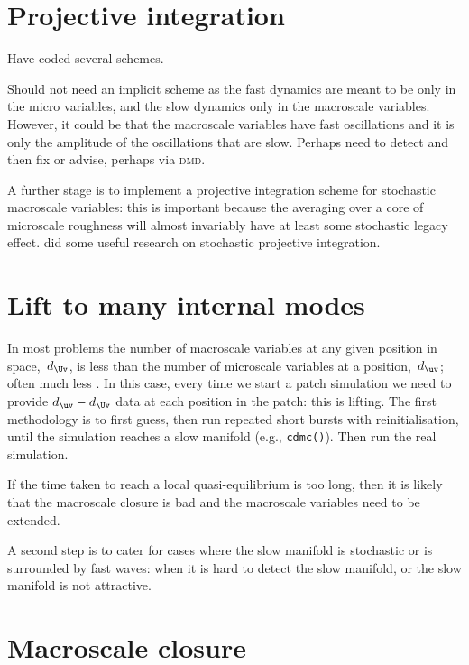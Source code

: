 \section{Projective integration}

Have coded several schemes.

Should not need an implicit scheme as the fast dynamics are meant to be only in the micro variables, and the slow dynamics only in the macroscale variables.
However, it could be that the macroscale variables have fast oscillations and it is only the amplitude of the oscillations that are slow.  
Perhaps need to detect and then fix or advise, perhaps via \textsc{dmd}.

A further stage is to implement a projective integration scheme for stochastic macroscale variables: this is important because the averaging over a core of microscale roughness will almost invariably have at least some stochastic legacy effect.
\cite{Calderon2007} did some useful research on stochastic projective integration.




\section{Lift to many internal modes}

In most problems the number of macroscale variables at any given position in space,~\(d_{\Uv}\), is less than the number of microscale variables at a position,~\(d_{\uv}\); often much less \citep[e.g.]{Kevrekidis09a}.
In this case, every time we start a patch simulation we need to provide  \(d_{\uv}-d_{\Uv}\) data at each position in the patch: this is lifting.
The first methodology is to first guess, then run repeated short bursts with reinitialisation, until the simulation reaches a slow manifold (e.g., \verb|cdmc()|).
Then run the real simulation.

If the time taken to reach a local quasi-equilibrium is too long, then it is likely that the macroscale closure is bad and the macroscale variables need to be extended.

A second step is to cater for cases where the slow manifold is stochastic or is surrounded by fast waves: when it is hard to detect the slow manifold, or the slow manifold is not attractive.





\section{Macroscale closure}


